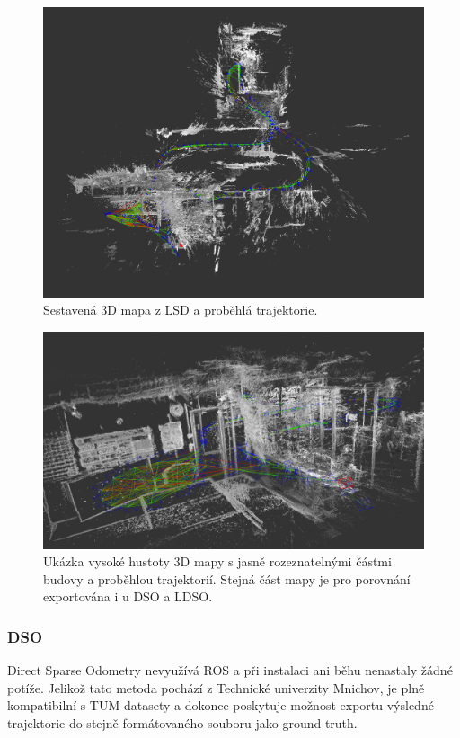 \documentclass[12pt,a4paper]{article}
\begin{document}
\begin{figure}[H]
\centering
\includegraphics[scale=0.455]{img/LSD_11_top.png}
\caption{Sestavená 3D mapa z LSD a proběhlá trajektorie.}
\end{figure} 

\begin{figure}[H]
\centering
\includegraphics[scale=0.31]{img/LSD_11_kancl.png}
\caption{Ukázka vysoké hustoty 3D mapy s jasně rozeznatelnými částmi budovy a proběhlou trajektorií. Stejná část mapy je pro porovnání exportována i u DSO a LDSO.}
\end{figure} 

\subsubsection{DSO}
Direct Sparse Odometry nevyužívá ROS a při instalaci ani běhu nenastaly žádné potíže. Jelikož tato metoda pochází z Technické univerzity Mnichov, je plně kompatibilní s TUM datasety a dokonce poskytuje možnost exportu výsledné trajektorie do stejně formáto\-vaného souboru jako ground-truth.
\end{document}
